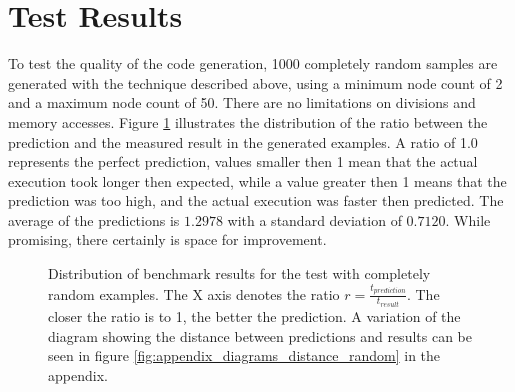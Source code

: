 \newpage



\section{Test Results}
\label{sect:results_results}
To test the quality of the code generation, 1000 completely random samples are generated with the technique described above, using a minimum node count of 2 and a maximum node count of 50. There are no limitations on divisions and memory accesses. Figure \ref{fig:results_distribution} illustrates the distribution of the ratio between the prediction and the measured result in the generated examples. A ratio of 1.0 represents the perfect prediction, values smaller then 1 mean that the actual execution took longer then expected, while a value greater then 1 means that the prediction was too high, and the actual execution was faster then predicted. The average of the predictions is $1.2978$ with a standard deviation of $0.7120$. While promising, there certainly is space for improvement. \\

\begin{figure}[p]
	\begin{center}
	\end{center}
	\caption{Distribution of benchmark results for the test with completely random examples. The X axis denotes the ratio $r = \frac{t_{prediction}}{t_{result}}$. The closer the ratio is to 1, the better the prediction. A variation of the diagram showing the distance between predictions and results can be seen in figure \ref{fig:appendix_diagrams_distance_random} in the appendix.}
	\label{fig:results_distribution}
\end{figure}

